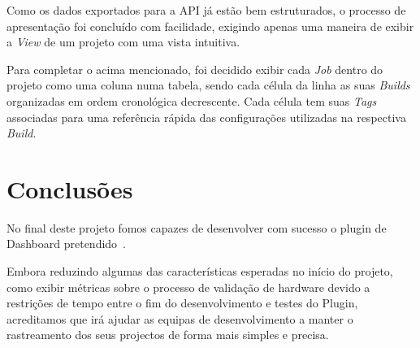 \documentclass[9pt,a4paper]{extarticle}
\begin{document}
\begin{multicols}{2}
Como os dados exportados para a API já estão bem estruturados, o processo de apresentação foi concluído com facilidade, exigindo apenas uma maneira de exibir a \textit{View} de um projeto com uma vista intuitiva.

Para completar o acima mencionado, foi decidido exibir cada \textit{Job} dentro do projeto como uma coluna numa tabela, sendo cada célula da linha as suas \textit{Builds} organizadas em ordem cronológica decrescente. Cada célula tem suas \textit{Tags} associadas para uma referência rápida das configurações utilizadas na respectiva \textit{Build}.

\section{Conclusões}\label{sec:conclui}

No final deste projeto fomos capazes de desenvolver com sucesso o plugin de Dashboard pretendido~\cite{jksn:myplugin}.

Embora reduzindo algumas das características esperadas no início do projeto, como exibir métricas sobre o processo de validação de hardware devido a restrições de tempo entre o fim do desenvolvimento e testes do Plugin, acreditamos que irá ajudar as equipas de desenvolvimento a manter o rastreamento dos seus projectos de forma mais simples e precisa.



\end{multicols}
\end{document}
